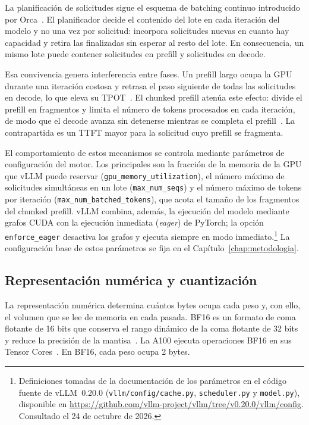 La planificación de solicitudes sigue el esquema de batching continuo introducido por Orca~\cite{yu2022orca}. El planificador decide el contenido del lote en cada iteración del modelo y no una vez por solicitud: incorpora solicitudes nuevas en cuanto hay capacidad y retira las finalizadas sin esperar al resto del lote. En consecuencia, un mismo lote puede contener solicitudes en prefill y solicitudes en decode.

Esa convivencia genera interferencia entre fases. Un prefill largo ocupa la GPU durante una iteración costosa y retrasa el paso siguiente de todas las solicitudes en decode, lo que eleva su TPOT~\cite{agrawal2024sarathi}. El chunked prefill atenúa este efecto: divide el prefill en fragmentos y limita el número de tokens procesados en cada iteración, de modo que el decode avanza sin detenerse mientras se completa el prefill~\cite{agrawal2024sarathi}. La contrapartida es un TTFT mayor para la solicitud cuyo prefill se fragmenta.

El comportamiento de estos mecanismos se controla mediante parámetros de configuración del motor. Los principales son la fracción de la memoria de la GPU que vLLM puede reservar (\texttt{gpu\_memory\_utilization}), el número máximo de solicitudes simultáneas en un lote (\texttt{max\_num\_seqs}) y el número máximo de tokens por iteración (\texttt{max\_num\_batched\_tokens}), que acota el tamaño de los fragmentos del chunked prefill. vLLM combina, además, la ejecución del modelo mediante grafos CUDA con la ejecución inmediata (\textit{eager}) de PyTorch; la opción \texttt{enforce\_eager} desactiva los grafos y ejecuta siempre en modo inmediato.\footnote{Definiciones tomadas de la documentación de los parámetros en el código fuente de vLLM~0.20.0 (\texttt{vllm/config/cache.py}, \texttt{scheduler.py} y \texttt{model.py}), disponible en \url{https://github.com/vllm-project/vllm/tree/v0.20.0/vllm/config}. Consultado el 24 de octubre de 2026.}
La configuración base de estos parámetros se fija en el Capítulo~\ref{chap:metodologia}.

\subsection{Representación numérica y cuantización}
\label{sec:cap1:cuantizacion}

La representación numérica determina cuántos bytes ocupa cada peso y, con ello, el volumen que se lee de memoria en cada pasada. BF16 es un formato de coma flotante de 16 bits que conserva el rango dinámico de la coma flotante de 32 bits y reduce la precisión de la mantisa~\cite{kalamkar2019bfloat16}. La A100 ejecuta operaciones BF16 en sus Tensor Cores~\cite{nvidia2021a100}. En BF16, cada peso ocupa 2 bytes.

